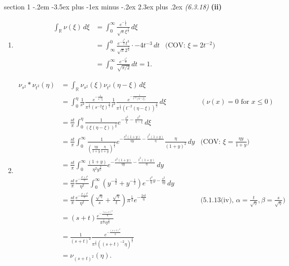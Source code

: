 \documentclass[12pt]{article}
\makeatletter
\theoremstyle{norm}
\newcommand{\R}[0]{\mathbb{R}}
\newcommand{\rc}[1]{\frac{1}{#1}}
\newcommand{\al}[0]{\alpha}
\newcommand{\be}[0]{\beta}
\newcommand{\pa}[1]{\left( {#1} \right)}
\newcommand{\subprob}[1]{\noindent\textbf{#1}\\}
\newcommand{\iy}[0]{\infty}
\newenvironment{problem}{\@startsection
       {section}
       {1}
       {-.2em}
       {-3.5ex plus -1ex minus -.2ex}
       {2.3ex plus .2ex}
       {\pagebreak[3]%
       \large\bf\noindent{Problem }
       }
       }
       {%
       }
\makeatother
\begin{document}
\begin{problem}{\it (6.3.18)}
\subprob{(ii)}
\begin{enumerate}
\item 
\begin{align*}
\int_{\R}\nu(\xi)\,d\xi&=\int_0^{\iy} \frac{e^{-\rc{\xi}}}{\sqrt{\pi}\xi^{\frac 32}}\,d\xi\\
&=\int_{\iy}^0 \frac{e^{-\frac{t^2}{2}}t^3}{\sqrt{\pi}2^{\frac 32}}\cdot -4t^{-3}\,dt&\text{(COV: }\xi=2t^{-2})\\
&=\int_0^{\iy} \frac{e^{-\frac{t^2}2}}{\sqrt{\pi/2}}\,dt=1.
\end{align*}
\item
\begin{align*}
\nu_{s^2}*\nu_{t^2}(\eta)&=\int_{\R} \nu_{s^2}(\xi)\nu_{t^2}(\eta-\xi) \,d\xi \\
&=\int_0^{\eta} \rc{s^2}\frac{e^{-\rc{s^{-2}\xi}}}{\pi^{\rc2}(s^{-2}\xi)^{\frac32}}\rc{t^2}\frac{e^{-\rc{t^{-2}(\eta-\xi)}}}{\pi^{\rc2}(t^{-2}(\eta-\xi))^{\frac 32}}\,d\xi &(\nu(x)=0\text{ for }x\le 0)\\%
&=\frac{st}{\pi}\int_0^{\eta} \rc{(\xi(\eta-\xi))^{\frac 32}}e^{-\frac{s^2}{\xi}-\frac{t^2}{\eta-\xi}}\,d\xi\\%
&=\frac{st}{\pi} \int_0^{\iy} \rc{\pa{\frac{\eta y}{1+y}\frac{\eta}{1+y}}^{\frac 32}}e^{-\frac{s^2(1+y)}{\eta y}-\frac{t^2 (1+y)}{\eta}}\frac{\eta}{(1+y)^2}\,dy&\text{(COV: }\xi=\frac{\eta y}{1+y})\\%
&=\frac{st}{\pi}\int_0^{\iy} \frac{(1+y)}{\eta^2y^{\frac 32}} e^{-\frac{s^2(1+y)}{\eta y}-\frac{t^2 (1+y)}{\eta}}\,dy\\%
&=\frac{st}{\pi}\frac{e^{-\frac{s^2+t^2}{\eta}}}{\eta^2} \int_0^{\iy} (y^{-\frac 32}+y^{-\frac 12}) e^{-\frac{t^2}{\eta}y-\frac{s^2}{\eta y}}\,dy\\
&=\frac{st}{\pi} \frac{e^{-\frac{s^2+t^2}{\eta}}}{\eta^2}\pa{\frac{\sqrt{\eta}}{s}+\frac{\sqrt{\eta}}{t}}\pi^{\rc 2}e^{-\frac{2st}{\eta}}&\text{(5.1.13(iv), }\al=\frac{t}{\sqrt{\eta}},\be=\frac{s}{\sqrt{\eta}})\\
&=(s+t)\frac{e^{-\frac{(s+t)^2}{\eta}}}{\pi^{\rc2}\eta^{\frac 32}}\\
&=\rc{(s+t)^2}\frac{e^{-\frac{(s+t)^2}{\eta}}}{\pi^{\rc2}((s+t)^{-2}\eta)^{\frac 32}}\\
&=\nu_{(s+t)^2}(\eta).
\end{align*}
\end{enumerate}


\end{problem}
\end{document}
